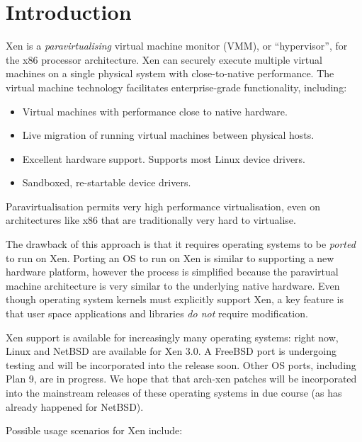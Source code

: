 \chapter{Introduction}


Xen is a \emph{paravirtualising} virtual machine monitor (VMM), or
``hypervisor'', for the x86 processor architecture.  Xen can securely
execute multiple virtual machines on a single physical system with
close-to-native performance.  The virtual machine technology
facilitates enterprise-grade functionality, including:

\begin{itemize}
\item Virtual machines with performance close to native hardware.
\item Live migration of running virtual machines between physical
  hosts.
\item Excellent hardware support. Supports most Linux device drivers.
\item Sandboxed, re-startable device drivers.
\end{itemize}

Paravirtualisation permits very high performance virtualisation, even
on architectures like x86 that are traditionally very hard to
virtualise.

The drawback of this approach is that it requires operating systems to
be \emph{ported} to run on Xen.  Porting an OS to run on Xen is
similar to supporting a new hardware platform, however the process is
simplified because the paravirtual machine architecture is very
similar to the underlying native hardware. Even though operating
system kernels must explicitly support Xen, a key feature is that user
space applications and libraries \emph{do not} require modification.

Xen support is available for increasingly many operating systems:
right now, Linux and NetBSD are available for Xen 3.0.
A FreeBSD port is undergoing testing and will be incorporated into the
release soon. Other OS ports, including Plan 9, are in progress.  We
hope that that arch-xen patches will be incorporated into the
mainstream releases of these operating systems in due course (as has
already happened for NetBSD).

Possible usage scenarios for Xen include:

